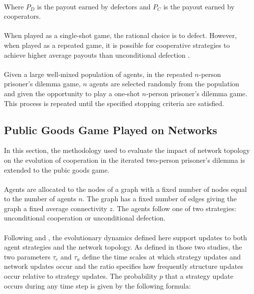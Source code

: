 \documentclass{article}
\begin{document}
	\paragraph{}Where $P_D$ is the payout earned by defectors and $P_C$ is the payout earned by cooperators.
	\paragraph{}When played as a single-shot game, the rational choice is to defect.  However, when played as a repeated game, it is possible for cooperative strategies to achieve higher average payouts than unconditional defection \cite{Boyd1988}\cite{Boyd1992}\cite{Hauert2002}\cite{Hauert2007}.
	\paragraph{}Given a large well-mixed population of agents, in the repeated $n$-person prisoner's dilemma game, $n$ agents are selected randomly from the population and given the opportunity to play a one-shot $n$-person prisoner's dilemma game.  This process is repeated until the specified stopping criteria are satisfied.

	\subsection{Public Goods Game Played on Networks}
	In this section, the methodology used to evaluate the impact of network topology on the evolution of cooperation in the iterated two-person prisoner's dilemma is extended to the pubic goods game.
	\paragraph{}Agents are allocated to the nodes of a graph with a fixed number of nodes equal to the number of agents $n$.  The graph has a fixed number of edges giving the graph a fixed average connectivity $z$.  The agents follow one of two strategies: unconditional cooperation or unconditional defection.
	\paragraph{}Following \cite{Santos2006d} and \cite{Fu2008}, the evolutionary dynamics defined here support updates to both agent strategies and the network topology.  As defined in those two studies, the two parameters $\tau_e$ and $\tau_a$ define the time scales at which strategy updates and network updates occur and the ratio  specifies how frequently structure updates occur relative to strategy updates.  The probability $p$ that a strategy update occurs during any time step is given by the following formula:
\end{document}
